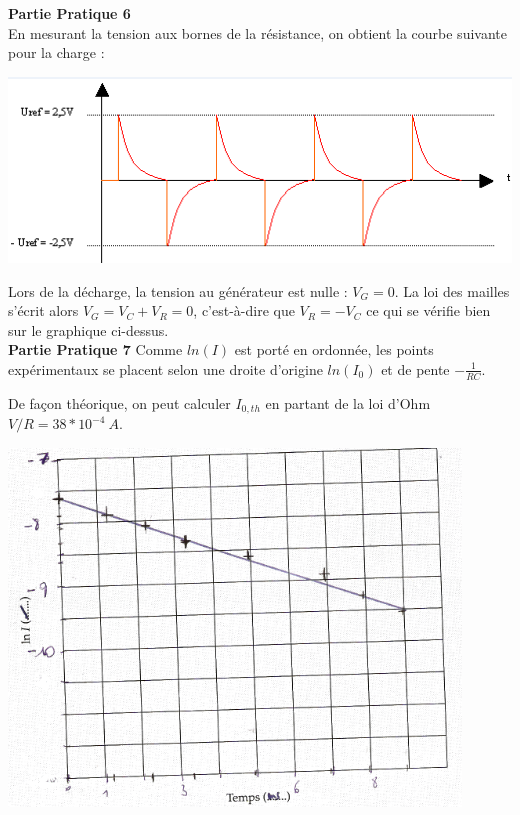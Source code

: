 \documentclass	[11pt, a4paper, openany]{book}
\begin{document}
		\textbf{Partie Pratique 6}\\
		En mesurant la tension aux bornes de la résistance, on obtient la courbe suivante pour la charge :
		\begin{center}
			\includegraphics[scale=0.5]{labo/image21.png}
		\end{center}
		Lors de la décharge, la tension au générateur est nulle : $V_G = 0$. La loi des mailles s'écrit alors $V_G = V_C + V_R = 0$, c'est-à-dire que $V_R = - V_C$ ce qui se vérifie bien sur le graphique ci-dessus.\\
		
		\textbf{Partie Pratique 7}
		Comme $ln(I)$ est porté en ordonnée, les points expérimentaux se placent selon une droite d'origine $ln(I_0)$ et de pente $-\frac{1}{RC}$.
		
		De façon théorique, on peut calculer $I_{0, th}$ en partant de la loi d'Ohm $V/R = 38*10^{-4}\ A$.
		\begin{center}
			\includegraphics[scale=0.5]{labo/image24.png}
		\end{center}
		
\end{document}
